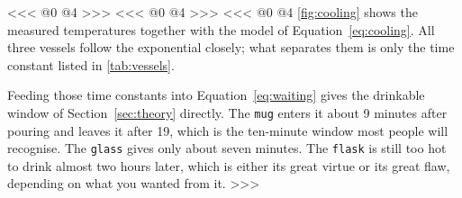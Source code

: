 <<<
@0
@4
>>>
<<<
@0
@4
>>>
<<<
@0
%
@4
\autoref{fig:cooling} shows the measured temperatures together with the model of Equation~\eqref{eq:cooling}.
All three vessels follow the exponential closely; what separates them is only the time constant listed in \autoref{tab:vessels}.

Feeding those time constants into Equation~\eqref{eq:waiting} gives the drinkable window of Section~\ref{sec:theory} directly.
The \texttt{mug} enters it about 9 minutes after pouring and leaves it after 19,
which is the ten-minute window most people will recognise.
The \texttt{glass} gives only about seven minutes.
The \texttt{flask} is still too hot to drink almost two hours later,
which is either its great virtue or its great flaw,
depending on what you wanted from it.
>>>

